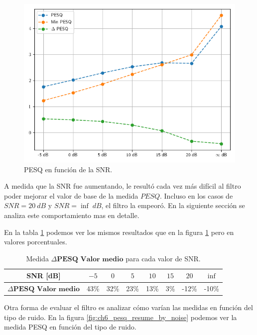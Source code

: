 \begin{figure}
	\centering
	\centerline{\includegraphics[scale=0.75]{images/ch6/af/objective_metrics/metric_PESQ.png}}
	\caption{PESQ en función de la SNR.}
	\label{fig:ch6_pesq_resume}
\end{figure}

A medida que la SNR fue aumentando, le resultó cada vez más difícil al filtro poder mejorar el valor de base de la medida $PESQ$. Incluso en los casos de $SNR = \SI{20}{dB}$ y $SNR = \inf \; dB$, el filtro la empeoró. En la siguiente sección se analiza este comportamiento mas en detalle.

En la tabla \ref{table:pesq_resume} podemos ver los mismos resultados que en la figura \ref{fig:ch6_pesq_resume} pero en valores porcentuales.

\begin{table}[ht]
	\centering
	\begin{tabular}{ |c|c|c|c|c|c|c|c| } 
		\hline
		SNR [dB] & $-5$ & $0$ & $5$ & $10$ & $15$ & $20$ & $\inf$ \\ 
		\hline
		$\Delta \textbf{PESQ Valor medio}$ & 43\%  & 32\% & 23\% & 13\% & 3\% & -12\% & -10\% \\ 
		\hline
	\end{tabular}
	\caption{Medida $\Delta \textbf{PESQ Valor medio}$ para cada valor de SNR.}
	\label{table:pesq_resume}
\end{table}

Otra forma de evaluar el filtro es analizar cómo varían las medidas en función del tipo de ruido. En la figura \ref{fig:ch6_pesq_resume_by_noise} podemos ver la medida PESQ en función del tipo de ruido.

